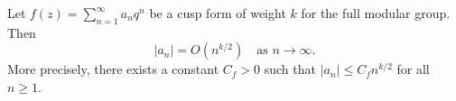 Let $f(z) = \sum_{n=1}^\infty a_n q^n$ be a cusp form of weight $k$ for the full modular group. Then
$$
|a_n| = O(n^{k/2}) \quad \text{as } n \to \infty.
$$
More precisely, there exists a constant $C_f > 0$ such that $|a_n| \leq C_f n^{k/2}$ for all $n \geq 1$.
